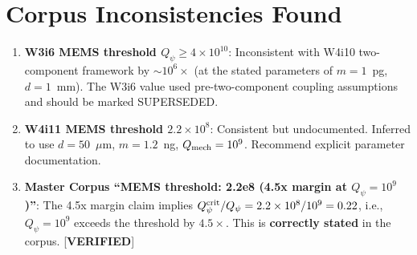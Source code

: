 \documentclass[11pt]{article}
\newcommand{\ee}[1]{\times 10^{#1}}
\newcommand{\Qpsi}{Q_\psi}
\theoremstyle{definition}
\theoremstyle{remark}
\begin{document}
\section*{Corpus Inconsistencies Found}

\begin{tcolorbox}[colback=red!5!white, colframe=red!60!black,
  title=\textbf{CORPUS INCONSISTENCY}]
\begin{enumerate}
\item \textbf{W3i6 MEMS threshold $\Qpsi \geq 4\ee{10}$}: Inconsistent
  with W4i10 two-component framework by $\sim 10^6\times$ (at the stated
  parameters of $m = 1$~pg, $d = 1$~mm). The W3i6 value used pre-two-component
  coupling assumptions and should be marked SUPERSEDED.

\item \textbf{W4i11 MEMS threshold $2.2\ee{8}$}: Consistent but undocumented.
  Inferred to use $d = 50$~$\mu$m, $m = 1.2$~ng, $Q_{\rm mech} = 10^9$.
  Recommend explicit parameter documentation.

\item \textbf{Master Corpus ``MEMS threshold: 2.2e8 (4.5x margin at $Q_\psi = 10^9$)''}: The 4.5x margin claim implies $\Qpsi^{\rm crit}/\Qpsi = 2.2\ee{8}/10^9 = 0.22$, i.e., $\Qpsi = 10^9$ exceeds the threshold by $4.5\times$. This is \textbf{correctly stated} in the corpus. [\textbf{VERIFIED}]
\end{enumerate}
\end{tcolorbox}
\end{document}
